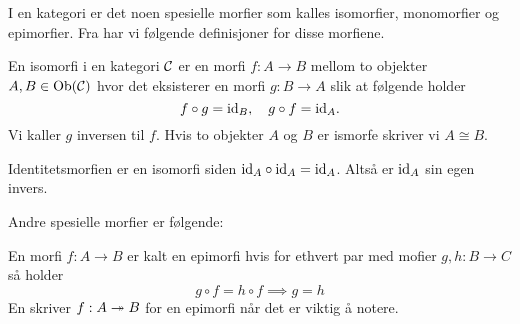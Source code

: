 

I en kategori er det noen spesielle morfier som kalles
isomorfier, monomorfier og epimorfier.
Fra \citep[definisjon 1.3.1]{Agore2023} har vi følgende
definisjoner for disse morfiene.
\begin{definisjon}\label{Def:Iso}
    En isomorfi i en kategori $\mathcal{C}$ er en morfi $f:A\to B$ mellom to objekter $A,B\in\textnormal{Ob}(\mathcal{C})$ hvor det eksisterer en morfi $g:B\to A$ slik at følgende holder
    \[f\circ g = \textnormal{id}_B,\quad g\circ f = \textnormal{id}_A.\]
    Vi kaller $g$ inversen til $f$. Hvis to objekter $A$ og $B$ er ismorfe skriver vi $A\cong B$.
\end{definisjon}

\begin{bemerk}\label{Rem:IdIso}
    Identitetsmorfien er en isomorfi siden $\textnormal{id}_A\circ\textnormal{id}_A = \textnormal{id}_A$. Altså er $\textnormal{id}_A$ sin egen invers.
\end{bemerk}

Andre spesielle morfier er følgende:
\begin{definisjon}\label{Def:Epi}
    En morfi $f: A\to B$ er kalt en epimorfi hvis for
    ethvert par med mofier $g,h: B\to C$ så holder
    \[g\circ f = h\circ f \implies g = h\]
    En skriver $f:A\twoheadrightarrow B$ for en epimorfi når det er
    viktig å notere.
\end{definisjon}

